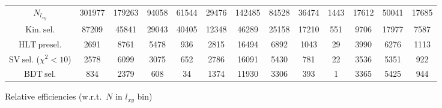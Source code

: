 \documentclass[10pt,a4paper]{article}
\begin{document}
\begin{landscape}
{\begin{tabular}{c|cccc|cccc|cccc}
\midrule
$N_{l_{xy}}$ & 301977 & 179263 & 94058 & 61544 & 29476 & 142485 & 84528 & 36474 & 1443 & 17612 & 50041 & 17685\\
$\mathrm{Kin.\ sel.}$ & 87209 & 45841 & 29043 & 40405 & 12348 & 46289 & 25158 & 17210 & 551 & 9706 & 17977 & 7587\\
$\mathrm{HLT\ presel.}$ & 2691 & 8761 & 5478 & 936 & 2815 & 16494 & 6892 & 1043 & 29 & 3990 & 6276 & 1113\\
$\mathrm{SV\ sel.}$ ($\chi^2{<}10$) & 2578 & 6099 & 3075 & 652 & 2786 & 16091 & 5430 & 781 & 22 & 3536 & 5351 & 922\\
$\mathrm{BDT\ sel.}$ & 834 & 2379 & 608 & 34 & 1374 & 11930 & 3306 & 393 & 1 & 3365 & 5425 & 944\\
\bottomrule
\end{tabular}}

\vspace{18pt}

Relative efficiencies (w.r.t.\ $N$ in $l_{xy}$ bin)


\end{landscape}
\end{document}
